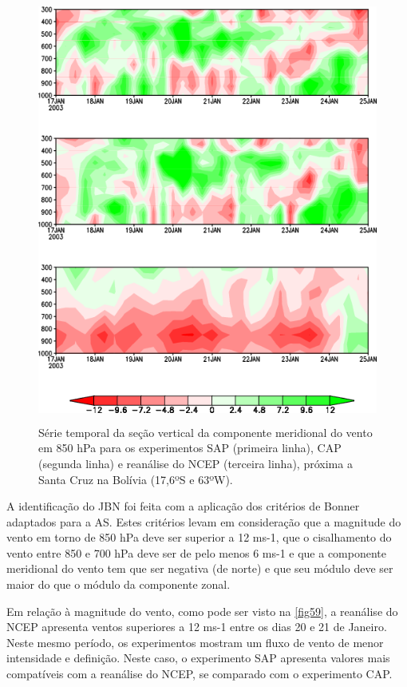 \begin{figure}
\includegraphics[height=14cm]{./figs/jatos.png}
\centering
\caption{Série temporal da seção vertical da componente meridional do vento em 850 hPa para os experimentos SAP (primeira linha), CAP (segunda linha) e reanálise do NCEP (terceira linha), próxima a Santa Cruz na Bolívia (17,6ºS e 63ºW).}
\label{fig59}
\end{figure}

A identificação do JBN foi feita com a aplicação dos critérios de Bonner \cite{bonner68} adaptados para a AS. Estes critérios levam em consideração que a magnitude do vento em torno de 850 hPa deve ser superior a 12 ms-1, que o cisalhamento do vento entre 850 e 700 hPa deve ser de pelo menos 6 ms-1 e que a componente meridional do vento tem que ser negativa (de norte) e que seu módulo deve ser maior do que o módulo da componente zonal.

Em relação à magnitude do vento, como pode ser visto na \autoref{fig59}, a reanálise do NCEP apresenta ventos superiores a 12 ms-1 entre os dias 20 e 21 de Janeiro. Neste mesmo período, os experimentos mostram um fluxo de vento de menor intensidade e definição. Neste caso, o experimento SAP apresenta valores mais compatíveis com a reanálise do NCEP, se comparado com o experimento CAP.


